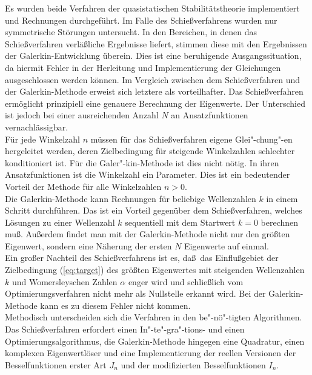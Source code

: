 \documentclass[10pt,a5paper,oneside,draft]{book}
\numberwithin{equation}{chapter}
\begin{document}
Es wurden beide Verfahren der quasistatischen Stabilit\"atstheorie implementiert und Rechnungen durchgef\"uhrt.
Im Falle des Schie\ss verfahrens wurden nur symmetrische St\"orungen untersucht.
In den Bereichen, in denen das Schie\ss verfahren verl\"a\ss liche Ergebnisse liefert, stimmen diese mit den Ergebnissen der Galerkin-Entwicklung \"uberein.
Dies ist eine beruhigende Ausgangssituation, da hiermit Fehler in der Herleitung und Implementierung der Gleichungen ausgeschlossen werden k\"onnen.
Im Vergleich zwischen dem Schie\ss verfahren und der Galerkin-Methode erweist sich letztere als vorteilhafter.
Das Schie\ss verfahren erm\"oglicht prinzipiell eine genauere Berechnung der Eigenwerte.
Der Unterschied ist jedoch bei einer ausreichenden Anzahl $N$ an Ansatzfunktionen vernachl\"assigbar.\\
F\"ur jede Winkelzahl $n$ m\"ussen f\"ur das Schie\ss verfahren eigene Glei"-chung"-en hergeleitet werden, deren Zielbedingung f\"ur steigende Winkelzahlen schlechter konditioniert ist.
F\"ur die Galer"-kin-Methode ist dies nicht n\"otig.
In ihren Ansatzfunktionen ist die Winkelzahl ein Parameter.
Dies ist ein bedeutender Vorteil der Methode f\"ur alle Winkelzahlen $n>0$.\\
Die Galerkin-Methode kann Rechnungen f\"ur beliebige Wellenzahlen $k$ in einem Schritt durchf\"uhren.
Das ist ein Vorteil gegen\"uber dem Schie\ss verfahren, welches L\"osungen zu einer Wellenzahl $k$ sequentiell mit dem Startwert $k=0$ berechnen mu\ss.
Au\ss erdem findet man mit der Galerkin-Methode nicht nur den gr\"o\ss ten Eigenwert, sondern eine N\"aherung der ersten $N$ Eigenwerte auf einmal.\\
Ein gro\ss er Nachteil des Schie\ss verfahrens ist es, da\ss\ das Einflu\ss gebiet der Zielbedingung (\mbox{\ref{eq:target}}) des gr\"o\ss ten Eigenwertes mit steigenden Wellenzahlen $k$ und Womersleyschen Zahlen $\alpha$ enger wird und schlie\ss lich vom Optimierungsverfahren nicht mehr als Nullstelle erkannt wird.
Bei der Galerkin-Methode kann es zu diesem Fehler nicht kommen.\\
Methodisch unterscheiden sich die Verfahren in den be"-n\"o"-tigten Algorithmen.
Das Schie\ss verfahren erfordert einen In"-te"-gra"-tions- und einen Optimierungsalgorithmus, die Galerkin-Methode hingegen eine Quadratur, einen komplexen Eigenwertl\"oser und eine Implementierung der reellen Versionen der Besselfunktionen erster Art $J_n$ und der modifizierten Besselfunktionen $I_n$.\\
\end{document}
